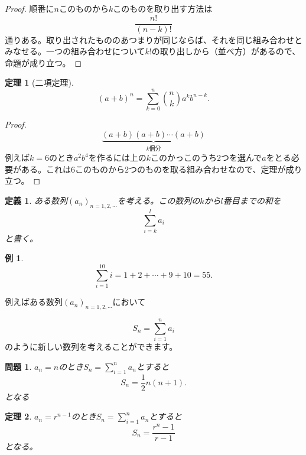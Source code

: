 \documentclass{ltjsarticle}
\newtheorem{theorem}{定理}[section]
\newtheorem{definition}{定義}[section]
\newtheorem{exercise}{問題}
\newtheorem{example}{例}[section]
\begin{document}
\begin{proof}
順番に$n$このものから$k$このものを取り出す方法は
\begin{equation*}
{\frac {n!} {(n-k)!}}
\end{equation*}
通りある。取り出されたもののあつまりが同じならば、それを同じ組み合わせとみなせる。一つの組み合わせについて$k!$の取り出しから（並べ方）があるので、命題が成り立つ。
\end{proof}

\begin{theorem}[二項定理]
\begin{equation*}
(a+b)^n = \sum_{k=0}^n {n\choose k}a^kb^{n-k}.
\end{equation*}
\end{theorem}
\begin{proof}
\begin{equation*}
\underbrace{(a+b)(a+b)\cdots(a+b)}_{\text{$k$個分}}
\end{equation*}
例えば$k=6$のとき$a^2b^4$を作るには上の$k$このかっこのうち$2$つを選んで$a$をとる必要がある。これは$6$このものから$2$つのものを取る組み合わせなので、定理が成り立つ。
\end{proof}

\begin{definition}
ある数列$(a_n)_{n=1,2,\cdots}$を考える。この数列の$k$から$l$番目までの和を
\begin{equation*}
\sum_{i=k}^l a_i
\end{equation*}
と書く。
\end{definition}

\begin{example}
\begin{equation*}
\sum_{i=1}^{10} i = 1+2+\cdots+9+10 = 55.
\end{equation*}
\end{example}

例えばある数列$(a_n)_{n=1,2,\cdots}$において

\begin{equation*}
S_n = \sum_{i=1}^n a_i
\end{equation*}
のように新しい数列を考えることができます。

\begin{exercise}
$a_n = n$のとき$S_n=\sum_{i=1}^n a_n$とすると
\begin{equation*}
S_n = {\frac 1 2}n(n+1).
\end{equation*}
となる
\end{exercise}

\begin{theorem}
$a_n = r^{n-1}$のとき$S_n=\sum_{i=1}^n a_n$とすると
\begin{equation*}
S_n = {\frac {r^n-1} {r-1}}
\end{equation*}
となる。
\label{theorem_geometric_sum}
\end{theorem}
\end{document}
